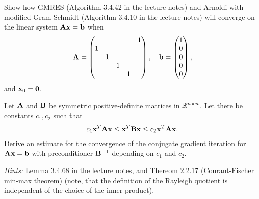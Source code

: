 
\begin{Sheet}
  \label{sheet10}

  \begin{Problem}
    Show how GMRES (Algorithm 3.4.42 in the lecture notes) and Arnoldi
    with modified Gram-Schmidt (Algorithm 3.4.10 in the lecture notes)
    will converge on the linear system $\mathbf A\mathbf x=\mathbf b$ when
    \begin{gather*}
      \mathbf A =
      \begin{pmatrix}
        &&&&1\\
        1&&&&\\
        &1&&&\\
        &&1&&\\
        &&&1&
      \end{pmatrix},
      \quad
      \mathbf b =
      \begin{pmatrix}
        1\\ 0\\ 0\\ 0\\ 0
      \end{pmatrix},
    \end{gather*}
    and $\mathbf x_0 = \boldsymbol 0$.
  \end{Problem}

  \begin{Problem}
	Let $\mathbf A$ and $\mathbf B$ be symmetric positive-definite matrices in
	$\mathbb R^{n\times n}$. Let there be constants $c_1,c_2$ such that
	\begin{gather*}
	c_1 \mathbf x^T\mathbf A\mathbf x \leq \mathbf x^T\mathbf B\mathbf x \leq c_2 \mathbf x^T\mathbf A\mathbf x.
	\end{gather*}
	Derive an estimate for the convergence of the conjugate gradient
	iteration for $\mathbf A\mathbf x=\mathbf b$ with preconditioner $\mathbf B^{-1}$
	depending on $c_1$ and $c_2$.
	
	\textit{Hints:} Lemma 3.4.68 in the lecture notes, and Thereom
	2.2.17 (Courant-Fischer min-max theorem) (note, that the definition of the Rayleigh quotient is
	independent of the choice of the inner product).
\end{Problem}


\end{Sheet}
